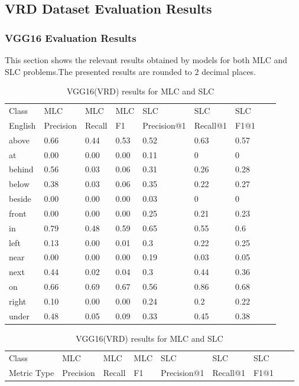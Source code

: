 \documentclass{csfyp}
\begin{document}
\subsection{VRD Dataset Evaluation Results}
\subsubsection{VGG16 Evaluation Results}
This section shows the relevant results obtained by models for both MLC and SLC problems.The presented results are rounded to 2 decimal places.
\newpage
\begin{table}[!htbp]
\centering
\begin{tabular}{|l|l|l|l|l|l|l|l|l}
\cline{1-7}
Class   &  MLC  &  MLC  &  MLC & SLC &  SLC & SLC \\ \cline{1-7}
English & Precision &  Recall   & F1 & Precision@1 & Recall@1 & F1@1 \\ \cline{1-7}
above	&	0.66	&	0.44	&	0.53	&	0.52	&	0.63	&	0.57 \\ \cline{1-7}
at	    &	0.00	&	0.00	&	0.00	&	0.11	&	0	&	0 \\ \cline{1-7} 
behind	&	0.56	&	0.03	&	0.06	&	0.31	&	0.26	&	0.28 \\ \cline{1-7}
below	&	0.38	&	0.03	&	0.06	&	0.35	&	0.22	&	0.27 \\ \cline{1-7} 
beside	&	0.00	&	0.00	&	0.00	&	0.03	&	0	    &	0 \\ \cline{1-7} 
front	&	0.00	&	0.00	&	0.00	&	0.25	&	0.21	&	0.23 \\ \cline{1-7} 
in	    &	0.79	&	0.48	&	0.59	&	0.65	&	0.55	&	0.6 \\ \cline{1-7} 
left	&	0.13	&	0.00	&	0.01	&	0.3	    &	0.22	&	0.25 \\ \cline{1-7} 
near	&	0.00	&	0.00	&	0.00	&	0.19	&	0.03	&	0.05 \\ \cline{1-7} 
next	&	0.44	&	0.02	&	0.04	&	0.3	    &	0.44	&	0.36 \\ \cline{1-7} 
on	    &	0.66	&	0.69	&	0.67	&	0.56	&	0.86	&	0.68 \\ \cline{1-7} 
right	&	0.10	&	0.00	&	0.00	&	0.24	&	0.2	    &	0.22 \\ \cline{1-7} 
under	&	0.48	&	0.05	&	0.09	&	0.33	&	0.45	&	0.38 \\ \cline{1-7}
\end{tabular}
\caption{VGG16(VRD) results for MLC and SLC}
\centering
\begin{tabular}{|l|l|l|l|l|l|l|l|l}
\cline{1-7}
Class &  MLC  &  MLC  &  MLC & SLC &  SLC & SLC \\ \cline{1-7}
Metric Type  & Precision &  Recall & F1 & Precision@1 & Recall@1 & F1@1 \\ \cline{1-7}

\end{tabular}
\end{table}
\end{document}
